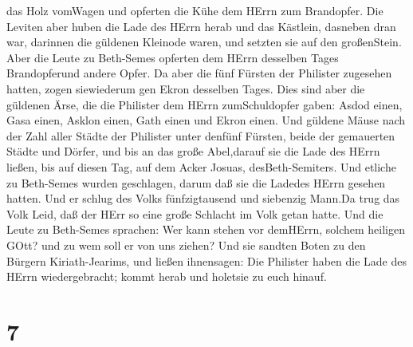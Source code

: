 das Holz vomWagen und opferten die Kühe dem HErrn zum Brandopfer.
 Die Leviten aber huben die Lade des HErrn herab und das
Kästlein, dasneben dran war, darinnen die güldenen Kleinode waren, und
setzten sie auf den großenStein. Aber die Leute zu Beth-Semes opferten
dem HErrn desselben Tages Brandopferund andere Opfer.  Da
aber die fünf Fürsten der Philister zugesehen hatten, zogen siewiederum
gen Ekron desselben Tages.  Dies sind aber die güldenen
Ärse, die die Philister dem HErrn zumSchuldopfer gaben: Asdod einen,
Gasa einen, Asklon einen, Gath einen und Ekron einen.  Und
güldene Mäuse nach der Zahl aller Städte der Philister unter denfünf
Fürsten, beide der gemauerten Städte und Dörfer, und bis an das große
Abel,darauf sie die Lade des HErrn ließen, bis auf diesen Tag, auf dem
Acker Josuas, desBeth-Semiters.  Und etliche zu Beth-Semes
wurden geschlagen, darum daß sie die Ladedes HErrn gesehen hatten. Und
er schlug des Volks fünfzigtausend und siebenzig Mann.Da trug das Volk
Leid, daß der HErr so eine große Schlacht im Volk getan hatte.
 Und die Leute zu Beth-Semes sprachen: Wer kann stehen vor
demHErrn, solchem heiligen GOtt? und zu wem soll er von uns ziehen?
 Und sie sandten Boten zu den Bürgern Kiriath-Jearims, und
ließen ihnensagen: Die Philister haben die Lade des HErrn
wiedergebracht; kommt herab und holetsie zu euch hinauf.

\hypertarget{section-6}{%
\section{7}\label{section-6}}

